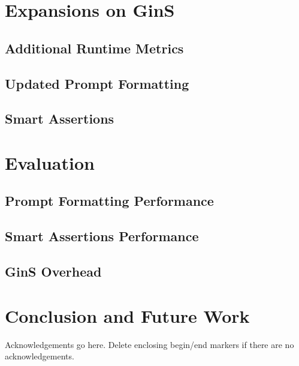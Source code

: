 \documentclass[sigconf]{acmart}
\begin{document}
\section{Expansions on GinS}

\subsection{Additional Runtime Metrics}

\subsection{Updated Prompt Formatting}

\subsection{Smart Assertions}

\section{Evaluation}

\subsection{Prompt Formatting Performance}

\subsection{Smart Assertions Performance}

\subsection{GinS Overhead}

\section{Conclusion and Future Work}

\begin{acks}
Acknowledgements go here. Delete enclosing begin/end markers if there are no acknowledgements.
\end{acks}




\end{document}
